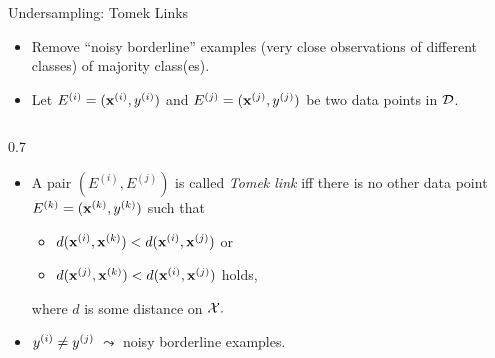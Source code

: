 \documentclass[11pt,compress,t,notes=noshow, aspectratio=169, xcolor=table]{beamer}
\begin{document}
\begin{frame}{Undersampling: Tomek Links}
    \small{

        \begin{itemize}            
            \item Remove ``noisy borderline'' examples (very close observations of different classes) of majority class(es).
            \item Let $E^{(i)} = (\xi,\yi)$ and $E^{(j)} = (\xv^{(j)},y^{(j)})$ be two data points in $\D$. %
        \end{itemize}
        \begin{columns}
            \begin{column}{0.7\textwidth}	
        
                \begin{itemize}

                    
                    \item A pair $(E^{(i)},E^{(j)})$ is called \emph{Tomek link} iff there is no other data point $E^{(k)} = (\xv^{(k)},y^{(k)})$ such that
        
                    \begin{itemize} 
                    \footnotesize
                
                       \item [] $d(\xv^{(i)}, \xv^{(k)}) < d(\xv^{(i)}, \xv^{(j)}) $ or
                       \item [] $d(\xv^{(j)}, \xv^{(k)}) < d(\xv^{(i)}, \xv^{(j)}) $ holds,
                    
                    \end{itemize}
        
                where $d$ is some distance on $\Xspace.$
                \item $\yi \neq \yi[j]$%
                $\leadsto$ noisy borderline examples.


\end{itemize}
\end{column}
\end{columns}}
\end{frame}
\end{document}
